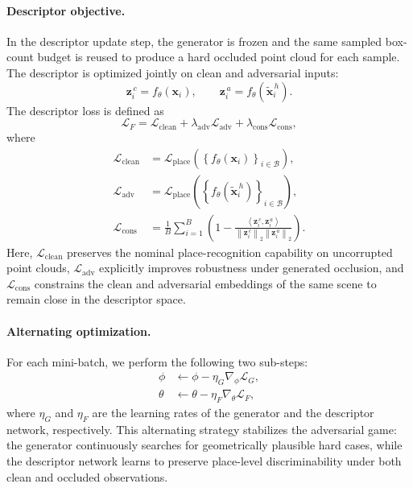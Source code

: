 \paragraph{Descriptor objective.}
In the descriptor update step, the generator is frozen and the same sampled box-count budget is reused to produce a
hard occluded point cloud for each sample. The descriptor is optimized jointly on clean and adversarial inputs:
\begin{equation}
\mathbf{z}^{\,c}_i = f_{\theta}(\mathbf{x}_i),
\qquad
\mathbf{z}^{\,a}_i = f_{\theta}(\tilde{\mathbf{x}}^{\,h}_i).
\end{equation}
The descriptor loss is defined as
\begin{equation}
\mathcal{L}_{F}
=
\mathcal{L}_{\mathrm{clean}}
+
\lambda_{\mathrm{adv}} \mathcal{L}_{\mathrm{adv}}
+
\lambda_{\mathrm{cons}} \mathcal{L}_{\mathrm{cons}},
\label{eq:descriptor_loss}
\end{equation}
where
\begin{align}
\mathcal{L}_{\mathrm{clean}}
&=
\mathcal{L}_{\mathrm{place}}
\left(
\left\{
f_{\theta}(\mathbf{x}_i)
\right\}_{i \in \mathcal{B}}
\right),
\\
\mathcal{L}_{\mathrm{adv}}
&=
\mathcal{L}_{\mathrm{place}}
\left(
\left\{
f_{\theta}(\tilde{\mathbf{x}}^{\,h}_i)
\right\}_{i \in \mathcal{B}}
\right),
\\
\mathcal{L}_{\mathrm{cons}}
&=
\frac{1}{B}
\sum_{i=1}^{B}
\left(
1 -
\frac{
\left\langle \mathbf{z}^{\,c}_i, \mathbf{z}^{\,a}_i \right\rangle
}{
\left\lVert \mathbf{z}^{\,c}_i \right\rVert_2
\left\lVert \mathbf{z}^{\,a}_i \right\rVert_2
}
\right).
\label{eq:consistency_loss}
\end{align}
Here, $\mathcal{L}_{\mathrm{clean}}$ preserves the nominal place-recognition capability on uncorrupted point clouds,
$\mathcal{L}_{\mathrm{adv}}$ explicitly improves robustness under generated occlusion, and
$\mathcal{L}_{\mathrm{cons}}$ constrains the clean and adversarial embeddings of the same scene to remain close in the
descriptor space.

\paragraph{Alternating optimization.}
For each mini-batch, we perform the following two sub-steps:
\begin{align}
\phi &\leftarrow \phi - \eta_{G} \nabla_{\phi} \mathcal{L}_{G},
\\
\theta &\leftarrow \theta - \eta_{F} \nabla_{\theta} \mathcal{L}_{F},
\end{align}
where $\eta_{G}$ and $\eta_{F}$ are the learning rates of the generator and the descriptor network, respectively.
This alternating strategy stabilizes the adversarial game: the generator continuously searches for geometrically
plausible hard cases, while the descriptor network learns to preserve place-level discriminability under both clean and
occluded observations.
